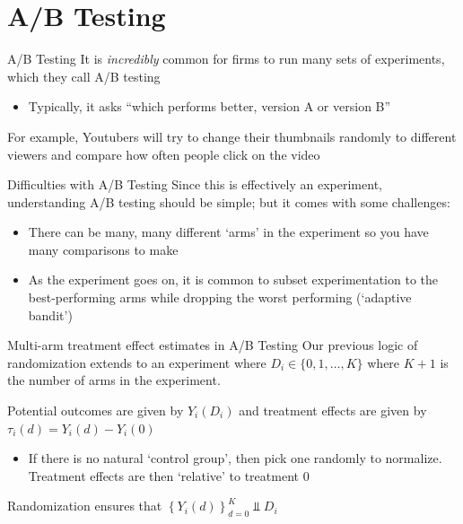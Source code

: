\documentclass[aspectratio=169,t,11pt,table]{beamer}
\begin{document}
\section{A/B Testing}

\begin{frame}{A/B Testing}
  It is \emph{incredibly} common for firms to run many sets of experiments, which they call A/B testing
  \begin{itemize}
    \item Typically, it asks ``which performs better, version A or version B''
  \end{itemize}

	\bigskip
	For example, Youtubers will try to change their thumbnails randomly to different viewers and compare how often people click on the video 
\end{frame}

\begin{frame}{Difficulties with A/B Testing}
	Since this is effectively an experiment, understanding A/B testing should be simple; but it comes with some challenges:
  \begin{itemize}
		\item There can be many, many different `arms' in the experiment so you have many comparisons to make 

		\item As the experiment goes on, it is common to subset experimentation to the best-performing arms while dropping the worst performing (`adaptive bandit')
	\end{itemize}
\end{frame}

\begin{frame}{Multi-arm treatment effect estimates in A/B Testing}
  Our previous logic of randomization extends to an experiment where $D_i \in \{0, 1, \dots, K \}$ where $K + 1$ is the number of arms in the experiment.

	\bigskip
	Potential outcomes are given by $Y_i(D_i)$ and treatment effects are given by $\tau_i(d) = Y_{i}(d) - Y_{i}(0)$
	\pause
	\begin{itemize}
		\item If there is no natural `control group', then pick one randomly to normalize. Treatment effects are then `relative' to treatment 0
	\end{itemize}

	\bigskip
	Randomization ensures that $\left\{ Y_i(d) \right\}_{d=0}^K \Perp D_i$
\end{frame}
\end{document}
